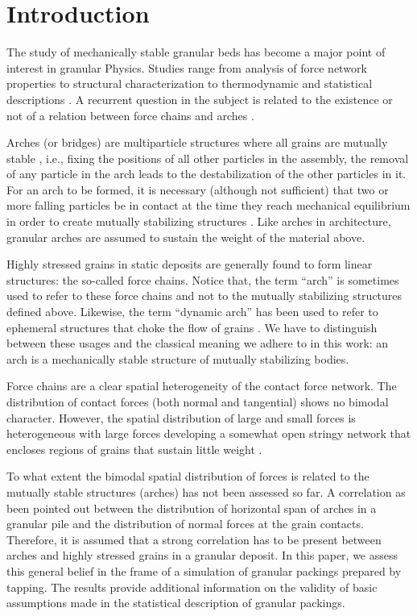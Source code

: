\section{Introduction}


The study of mechanically stable granular beds has become a major point of interest in granular Physics. Studies range from analysis of force network properties \cite{ostojic,behringer,mueth,peters} to structural characterization \cite{latzel,aste,torquato} to thermodynamic and statistical descriptions \cite{edwards1,henkes,tighe,snoeijer1,pugnaloni1}. A recurrent question in the subject is related to the existence or not of a relation between force chains and arches \cite{mehta1,mehta3}. 

Arches (or bridges) are multiparticle structures where all grains are mutually stable \cite{mehta1,pugnaloni2,pugnaloni3,jenkins}, i.e., fixing the positions of all other particles in the assembly, the removal of any particle in the arch leads to the destabilization of the other particles in it. For an arch to be formed, it is necessary (although not sufficient) that two or more falling particles be in contact at the time they reach mechanical equilibrium in order to create mutually stabilizing structures \cite{arevalo}. Like arches in architecture, granular arches are assumed to sustain the weight of the material above.        

Highly stressed grains in static deposits are generally found to form linear structures: the so-called force chains. Notice that, the term ``arch'' is sometimes used \cite{lovoll,dorbolo,nicodemi} to refer to these force chains and not to the mutually stabilizing structures defined above. Likewise, the term ``dynamic arch'' has been used to refer to ephemeral structures that choke the flow of grains \cite{luding1}. We have to distinguish between these usages and the classical meaning we adhere to in this work: an arch is a mechanically stable structure of mutually stabilizing bodies.

Force chains are a clear spatial heterogeneity of the contact force network. The distribution of contact forces (both normal and tangential) shows no bimodal character. However, the spatial distribution of large and small forces is heterogeneous with large forces developing a somewhat open stringy network that encloses regions of grains that sustain little weight \cite{radjai}. 

To what extent the bimodal spatial distribution of forces is related to the mutually stable structures (arches) has not been assessed so far. A correlation as been pointed out \cite{mehta1,pugnaloni2,mehta2} between the distribution of horizontal span of arches in a granular pile and the distribution of normal forces at the grain contacts. Therefore, it is assumed that a strong correlation has to be present between arches and highly stressed grains in a granular deposit. In this paper, we assess this general belief in the frame of a simulation of granular packings prepared by tapping. The results provide additional information on the validity of basic assumptions made in the statistical description of granular packings.



